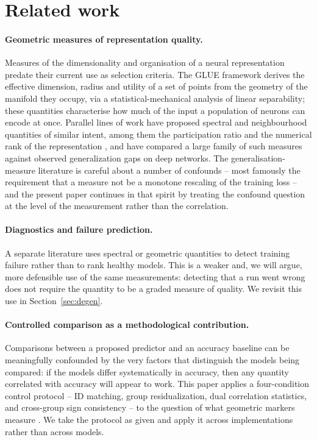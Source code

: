 \documentclass[10pt]{article}
\begin{document}
\section{Related work}

\label{sec:related}

\paragraph{Geometric measures of representation quality.}
Measures of the dimensionality and organisation of a neural representation
predate their current use as selection criteria. The GLUE framework
\citep{chung2018classification} derives the effective dimension, radius and
utility of a set of points from the geometry of the manifold they occupy, via a
statistical-mechanical analysis of linear separability; these quantities
characterise how much of the input a population of neurons can encode at once.
Parallel lines of work have proposed spectral and neighbourhood quantities of
similar intent, among them the participation ratio and the numerical rank of the
representation \citep{jiang2020fantastic}, and have compared a large family of
such measures against observed generalization gaps on deep networks. The
generalisation-measure literature is careful about a number of confounds -- most
famously the requirement that a measure not be a monotone rescaling of the
training loss \citep{jiang2020fantastic} -- and the present paper continues in
that spirit by treating the confound question at the level of the measurement
rather than the correlation.

\paragraph{Diagnostics and failure prediction.}
A separate literature uses spectral or geometric quantities to detect training
failure rather than to rank healthy models. This is a weaker and, we will
argue, more defensible use of the same measurements: detecting that a run went
wrong does not require the quantity to be a graded measure of quality. We
revisit this use in Section~\ref{sec:degen}.

\paragraph{Controlled comparison as a methodological contribution.}
Comparisons between a proposed predictor and an accuracy baseline can be
meaningfully confounded by the very factors that distinguish the models being
compared: if the models differ systematically in accuracy, then any quantity
correlated with accuracy will appear to work. This paper applies a four-condition
control protocol -- ID matching, group residualization, dual correlation
statistics, and cross-group sign consistency -- to the question of what
geometric markers measure \citep{zhou2026protocol}. We take the protocol as
given and apply it across implementations rather than across models.
\end{document}
